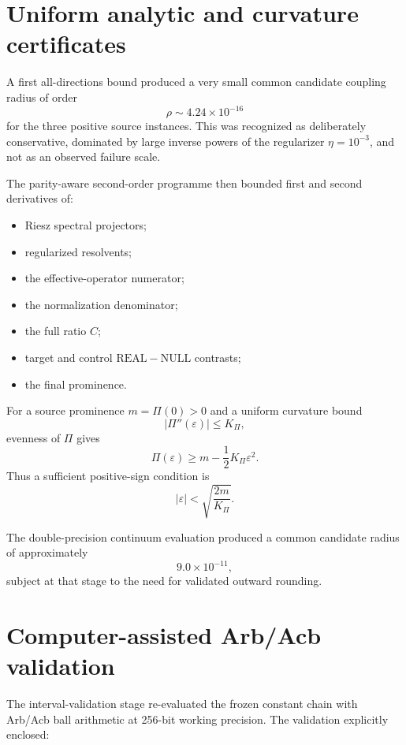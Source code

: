 \documentclass[11pt,a4paper]{article}
\newcommand{\Real}{\mathrm{REAL}}
\newcommand{\Null}{\mathrm{NULL}}
\newcommand{\eps}{\varepsilon}
\newcommand{\Prom}{\Pi}
\begin{document}
\section{Uniform analytic and curvature certificates}

A first all-directions bound produced a very small common candidate coupling
radius of order
\[
\rho\sim4.24\times10^{-16}
\]
for the three positive source instances.  This was recognized as deliberately
conservative, dominated by large inverse powers of the regularizer
\(\eta=10^{-3}\), and not as an observed failure scale.

The parity-aware second-order programme then bounded first and second
derivatives of:

\begin{itemize}
\item Riesz spectral projectors;
\item regularized resolvents;
\item the effective-operator numerator;
\item the normalization denominator;
\item the full ratio \(C\);
\item target and control \(\Real-\Null\) contrasts;
\item the final prominence.
\end{itemize}

For a source prominence \(m=\Prom(0)>0\) and a uniform curvature bound
\[
|\Prom''(\eps)|\le K_{\Prom},
\]
evenness of \(\Prom\) gives
\[
\Prom(\eps)
\ge
m-\frac12K_{\Prom}\eps^2.
\]
Thus a sufficient positive-sign condition is
\[
|\eps|
<
\sqrt{\frac{2m}{K_{\Prom}}}.
\]

The double-precision continuum evaluation produced a common candidate radius
of approximately
\[
9.0\times10^{-11},
\]
subject at that stage to the need for validated outward rounding.

\section{Computer-assisted Arb/Acb validation}

The interval-validation stage re-evaluated the frozen constant chain with
Arb/Acb ball arithmetic at 256-bit working precision.  The validation
explicitly enclosed:
\end{document}
